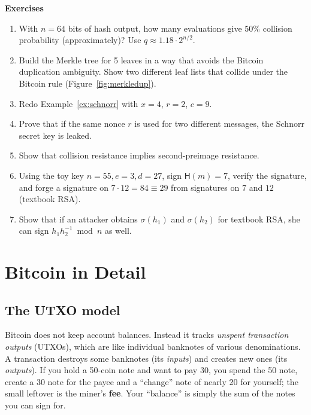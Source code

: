 \documentclass[11pt,a4paper]{article}
\newenvironment{plainenglish}{\par\smallskip}{\par\smallskip}
\newenvironment{exercisebox}{\par\medskip\noindent\textbf{Exercises}\par\nopagebreak\smallskip}{\par\medskip}
\theoremstyle{definition}
\theoremstyle{plain}
\theoremstyle{remark}
\newcommand{\Hash}{\mathsf{H}}
\begin{document}
\begin{exercisebox}
\begin{enumerate}[nosep]
\item With $n=64$ bits of hash output, how many evaluations give $50\%$ collision probability (approximately)? Use $q\approx1.18\cdot2^{n/2}$.
\item Build the Merkle tree for 5 leaves in a way that avoids the Bitcoin duplication ambiguity. Show two different leaf lists that collide under the Bitcoin rule (Figure~\ref{fig:merkledup}).
\item Redo Example~\ref{ex:schnorr} with $x=4$, $r=2$, $c=9$.
\item Prove that if the same nonce $r$ is used for two different messages, the Schnorr secret key is leaked.
\item Show that collision resistance implies second-preimage resistance.
\item Using the toy key $n=55,e=3,d=27$, sign $\Hash(m)=7$, verify the signature, and forge a signature on $7\cdot12=84\equiv29$ from signatures on $7$ and $12$ (textbook RSA).
\item Show that if an attacker obtains $\sigma(h_1)$ and $\sigma(h_2)$ for textbook RSA, she can sign $h_1h_2^{-1}\bmod n$ as well.
\end{enumerate}
\end{exercisebox}
\section{Bitcoin in Detail}\label{sec:bitcoin}

\subsection{The UTXO model}

\begin{plainenglish}
Bitcoin does not keep account balances. Instead it tracks \emph{unspent transaction outputs} (UTXOs), which are like individual banknotes of various denominations.
A transaction destroys some banknotes (its \emph{inputs}) and creates new ones (its \emph{outputs}). If you hold a 50-coin note and
want to pay 30, you spend the 50 note, create a 30 note for the payee and a ``change'' note of nearly 20 for yourself;
the small leftover is the miner's \textbf{fee}. Your ``balance'' is simply the sum of the notes you can sign for.
\end{plainenglish}
\end{document}
